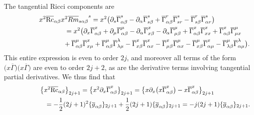 \documentclass[pdftex]{sigma}
\numberwithin{equation}{section}
\newcommand{\olg}{\overline{g}}
\newcommand{\olGamma}{\overline{\Gamma}}
\DeclareMathOperator{\Rc}{Rc}
\begin{document}
The tangential Ricci components are
\begin{gather*}
x^2 \overline{\Rc}_{\alpha \beta} x^2 {\overline{Rm}_{s \alpha \beta}}^{s}
= x^2 \big( \partial_s \olGamma_{\alpha \beta}^s - \partial_{\alpha} \olGamma_{s \beta}^s + \olGamma_{\alpha \beta}^r \olGamma_{sr}^s - \olGamma_{s \beta}^r \olGamma_{\alpha r}^s \big) \nonumber\\
\hphantom{x^2 \overline{\Rc}_{\alpha \beta} x^2 {\overline{Rm}_{s \alpha \beta}}^{s} }{} = x^2 \big( \partial_x \olGamma_{\alpha \beta}^x + \partial_{\mu} \olGamma_{\alpha \beta}^{\mu} - \partial_{\alpha} \olGamma_{x \beta}^x - \partial_{\alpha} \olGamma_{\mu \beta}^{\mu}
+ \olGamma_{\alpha \beta}^x \olGamma_{xx}^x + \olGamma_{\alpha \beta}^x \olGamma_{\mu x}^{\mu} \nonumber\\
\hphantom{x^2 \overline{\Rc}_{\alpha \beta} x^2 {\overline{Rm}_{s \alpha \beta}}^{s} =}{} + \olGamma_{\alpha \beta}^{\mu} \olGamma_{x\mu}^x + \olGamma_{\alpha \beta}^{\mu} \olGamma_{\lambda \mu}^{\lambda} - \olGamma_{x \beta}^x \olGamma_{\alpha x}^x - \olGamma_{\mu \beta}^x \olGamma_{\alpha x}^{\mu} - \olGamma_{x \beta}^{\mu} \olGamma_{\alpha \mu}^x - \olGamma_{\lambda \beta}^{\mu} \olGamma_{\alpha \mu}^{\lambda} \big).%
\end{gather*}
This entire expression is even to order $2j$, and moreover all terms of the form $\big(x \olGamma\big)\big(x \olGamma\big)$ are even to order $2j+2$, as are the derivative terms involving tangential partial derivatives. We thus find that
\begin{gather}
\big\{ x^2 \overline{\Rc}_{\alpha \beta} \big\}_{2j+1} = \big\{ x^2 \partial_x \olGamma_{\alpha \beta}^x \big\}_{2j+1}
=\big\{ x \partial_x \big( x \olGamma_{\alpha \beta}^x\big) - x \olGamma_{\alpha \beta}^x \big\}_{2j+1}\label{eqA.7}\\
\hphantom{\big\{ x^2 \overline{\Rc}_{\alpha \beta} \big\}_{2j+1}}{}= -\frac{1}{2} (2j+1)^2 \{\olg_{\alpha \beta}\}_{2j+1} + \frac{1}{2} (2j+1) \{\olg_{\alpha \beta}\}_{2j+1}
 = - j (2j+1)\{\olg_{\alpha \beta}\}_{2j+1} .\nonumber
\end{gather}
\end{document}
